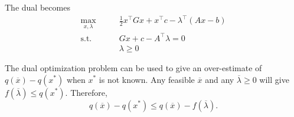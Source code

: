 The dual becomes
\begin{align*}
  \max_{x, \lambda}\qquad & \frac{1}{2}x^{\top}Gx + x^{\top}c - \lambda^{\top}(Ax-b) \\ 
  \text{s.t.}\qquad & Gx + c - A^{\top}\lambda = 0 \\ 
  &\lambda \geq 0
\end{align*}


The dual optimization problem can be used to give an over-estimate of $q(\overline{x}) - q(x^*)$ when $x^*$ is not known. 
Any feasible $\overline{x}$ and any $\overline{\lambda} \geq 0$ will give $f(\overline{\lambda}) \leq q(x^*)$. Therefore, 
\[
  q(\overline{x}) - q(x^*) \leq q(\overline{x}) - f(\overline{\lambda})
.\] 

